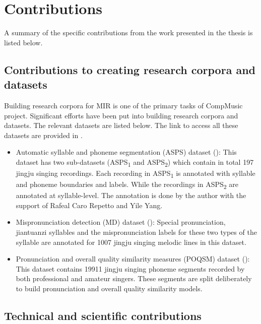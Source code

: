 \section{Contributions}

A summary of the specific contributions from the work presented in the thesis is listed below.

\subsection{Contributions to creating research corpora and datasets}

Building research corpora for MIR is one of the primary tasks of CompMusic project. Significant efforts have been put into building research corpora and datasets. The relevant datasets are listed below. The link to access all these datasets are provided in .

\begin{itemize}[leftmargin=*]
\item Automatic syllable and phoneme segmentation (ASPS) dataset (): This dataset has two sub-datasets (ASPS\textsubscript{1} and ASPS\textsubscript{2}) which contain in total 197 jingju singing recordings. Each recording in ASPS\textsubscript{1} is annotated with syllable and phoneme boundaries and labels. While the recordings in ASPS\textsubscript{2} are annotated at syllable-level. The annotation is done by the author with the support of Rafeal Caro Repetto and Yile Yang.
\item Mispronunciation detection (MD) dataset (): Special pronunciation, jiantuanzi syllables and the mispronunciation labels for these two types of the syllable are annotated for 1007 jingju singing melodic lines in this dataset.
\item Pronunciation and overall quality similarity measures (POQSM) dataset (): This dataset contains 19911 jingju singing phoneme segments recorded by both professional and amateur singers. These segments are split deliberately to build pronunciation and overall quality similarity models.
\end{itemize}

\subsection{Technical and scientific contributions}

